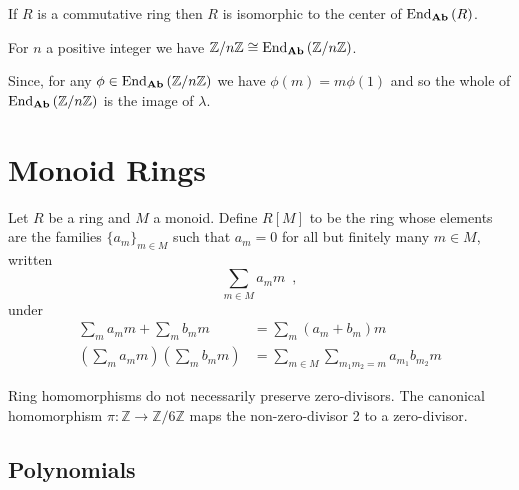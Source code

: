 \begin{cor}
If $R$ is a commutative ring then $R$ is isomorphic to the center of $\mathrm{End}_{\mathbf{Ab}} \left( {R} \right)$.
\end{cor}

\begin{ex}
For $n$ a positive integer we have $\mathbb{Z} / n \mathbb{Z} \cong \mathrm{End}_{\mathbf{Ab}} \left( {\mathbb{Z} / n \mathbb{Z}} \right)$.

Since, for any $\phi \in \mathrm{End}_{\mathbf{Ab}} \left( {\mathbb{Z} / n \mathbb{Z}} \right)$ we have $\phi(m) = m \phi(1)$ and so the whole of $\mathrm{End}_{\mathbf{Ab}} \left( {\mathbb{Z} / n \mathbb{Z}} \right)$ is the image of $\lambda$.
\end{ex}


\chapter{Monoid Rings}

\begin{df}
Let $R$ be a ring and $M$ a monoid. Define $R[M]$ to be the ring whose elements are the families $\{ a_m \}_{m \in M}$ such that $a_m = 0$ for all but finitely many $m \in M$, written
\[ \sum_{m \in M} a_m m \enspace , \]
under
\begin{align*}
\sum_m a_m m + \sum_m b_m m & = \sum_m (a_m + b_m) m \\
\left( \sum_m a_m m \right) \left( \sum_m b_m m \right) & = \sum_{m \in M} \sum_{m_1 m_2 = m} a_{m_1} b_{m_2} m
\end{align*}
\end{df}

\begin{ex}
Ring homomorphisms do not necessarily preserve zero-divisors. The canonical homomorphism $\pi : \mathbb{Z} \rightarrow \mathbb{Z} / 6 \mathbb{Z}$ maps the non-zero-divisor 2 to a zero-divisor.
\end{ex}

\section{Polynomials}


